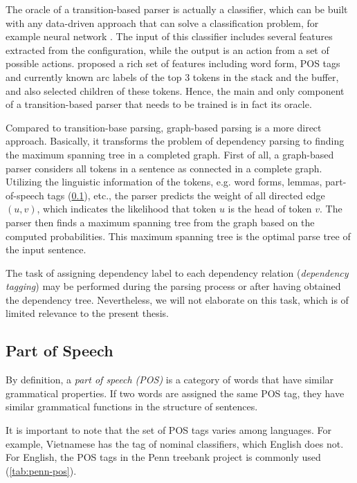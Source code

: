 The oracle of a transition-based parser is actually a classifier, which can be built with any data-driven approach that can solve a classification problem, for example neural network \citep{chen2014fast}.
The input of this classifier includes several features extracted from the configuration, while the output is an action from a set of possible actions.
\citeauthor{chen2014fast} proposed a rich set of features including word form, POS tags and currently known arc labels of the top 3 tokens in the stack and the buffer, and also selected children of these tokens.
Hence, the main and only component of a transition-based parser that needs to be trained is in fact its oracle.


Compared to transition-base parsing, graph-based parsing is a more direct approach.
Basically, it transforms the problem of dependency parsing to finding the maximum spanning tree in a completed graph.
First of all, a graph-based parser considers all tokens in a sentence as connected in a complete graph.
Utilizing the linguistic information of the tokens, e.g. word forms, lemmas, part-of-speech tags (\cref{the-ling-pos}), etc., the parser predicts the weight of all directed edge $(u,v)$, which indicates the likelihood that token $u$ is the head of token $v$.
The parser then finds a maximum spanning tree from the graph based on the computed probabilities.
This maximum spanning tree is the optimal parse tree of the input sentence.

The task of assigning dependency label to each dependency relation (\textit{dependency tagging}) may be performed during the parsing process or after having obtained the dependency tree. Nevertheless, we will not elaborate on this task, which is of limited relevance to the present thesis.

\subsection{Part of Speech}
\label{the-ling-pos}

By definition, a \textit{part of speech (POS)} is a category of words that have similar grammatical properties. If two words are assigned the same POS tag, they have similar grammatical functions in the structure of sentences.

It is important to note that the set of POS tags varies among languages. For example, Vietnamese has the tag of nominal classifiers, which English does not. For English, the POS tags in the Penn treebank project \citep{Marcus93buildinga} is commonly used (\cref{tab:penn-pos}).

